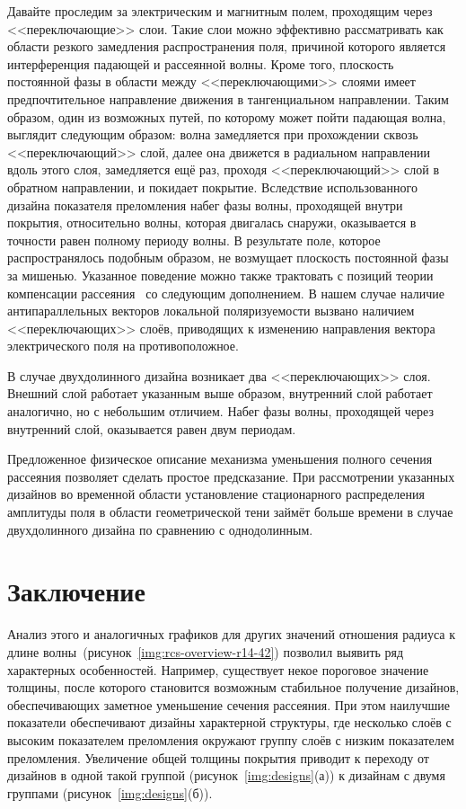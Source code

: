 Давайте проследим за электрическим и магнитным полем, проходящим
через <<переключающие>> слои.  Такие слои можно эффективно
рассматривать как области резкого замедления распространения поля,
причиной которого является интерференция падающей и рассеянной волны.
Кроме того, плоскость постоянной фазы в области между
<<переключающими>> слоями имеет предпочтительное направление движения
в тангенциальном направлении.  Таким образом, один из возможных путей,
по которому может пойти падающая волна, выглядит следующим образом:
волна замедляется при прохождении сквозь <<переключающий>> слой, далее
она движется в радиальном направлении вдоль этого слоя,
замедляется ещё раз, проходя <<переключающий>> слой в обратном
направлении, и покидает покрытие.  Вследствие использованного дизайна
показателя преломления  набег фазы волны, проходящей внутри покрытия,
относительно волны, которая двигалась снаружи, оказывается в точности
равен полному периоду волны.  В результате поле, которое
распространялось подобным образом, не возмущает плоскость постоянной
фазы за мишенью.  Указанное поведение можно также трактовать с позиций
теории компенсации рассеяния~\cite{alu} со следующим дополнением.  В
нашем случае наличие антипараллельных векторов локальной
поляризуемости  вызвано наличием <<переключающих>> слоёв, приводящих к
изменению направления вектора электрического поля на противоположное.

В случае двухдолинного дизайна возникает два <<переключающих>> слоя.
Внешний слой работает указанным выше образом, внутренний слой работает
аналогично, но с небольшим отличием.  Набег фазы волны, проходящей
через внутренний слой, оказывается равен двум периодам.

Предложенное физическое описание механизма уменьшения полного сечения
рассеяния позволяет сделать простое предсказание.  При рассмотрении
указанных дизайнов во временной области установление стационарного
распределения амплитуды поля в области геометрической тени займёт
больше времени в случае двухдолинного дизайна по сравнению с
однодолинным.  

\section{Заключение}
Анализ этого и аналогичных графиков для других значений отношения
радиуса к длине волны~(рисунок~\ref{img:rcs-overview-r14-42}) позволил
выявить ряд характерных особенностей. Например, существует некое
пороговое значение толщины, после которого становится возможным
стабильное получение дизайнов, обеспечивающих заметное уменьшение
сечения рассеяния. При этом наилучшие показатели обеспечивают дизайны
характерной структуры, где несколько слоёв с высоким показателем
преломления окружают группу слоёв с низким показателем
преломления. Увеличение общей толщины покрытия приводит к переходу от
дизайнов в одной такой группой (рисунок~\ref{img:designs}(а)) к
дизайнам с двумя группами (рисунок~\ref{img:designs}(б)).




